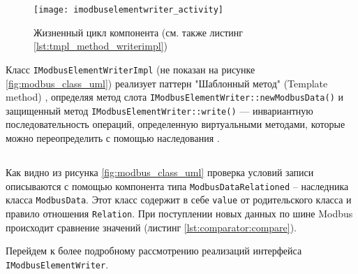 \begin{center}
    \begin{figure}
        \texttt{[image: imodbuselementwriter\_activity]}
        \caption{Жизненный цикл компонента (см. также листинг \ref{lst:tmpl_method_writerimpl})}\label{fig:imodbuselementwriter_activity}
    \end{figure}
\end{center}


Класс \texttt{IModbusElementWriterImpl} (не показан на рисунке \ref{fig:modbus_class_uml})
реализует паттерн "Шаблонный метод" (Template method) \cite[стр. 309]{book:pattern:band_of_4},
определяя метод слота \texttt{IModbusElementWriter::newModbusData()}
и защищенный метод \texttt{IModbusElementWriter::write()} --- инвариантную последовательность операций,
определенную виртуальными методами, которые можно переопределить с помощью наследования \cite[стр. 170]{book:tdd:KentBeck}.




\subsection{}
Как видно из рисунка \ref{fig:modbus_class_uml} проверка условий записи описываются с помощью компонента типа
\texttt{ModbusDataRelationed} -- наследника класса \texttt{ModbusData}.
Этот класс содержит в себе \texttt{value} от родительского класса и правило отношения \texttt{Relation}.
При поступлении новых данных по шине Modbus происходит сравнение значений (листинг \ref{lst:comparator:compare}).



Перейдем к более подробному рассмотрению реализаций интерфейса \texttt{IModbusElementWriter}.

